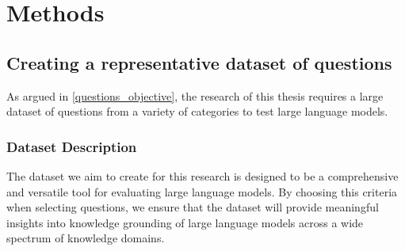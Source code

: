 \section{Methods}

\subsection{Creating a representative dataset of questions}
\label{creating_dataset}

As argued in \cref{questions_objective}, the research of this thesis requires a large dataset of questions from a variety of categories to test large language models.

\subsubsection{Dataset Description}

The dataset we aim to create for this research is designed to be a comprehensive and versatile tool for evaluating large language models.
By choosing this criteria when selecting questions, we ensure that the dataset will provide meaningful insights into knowledge grounding of large language models across a wide spectrum of knowledge domains.

